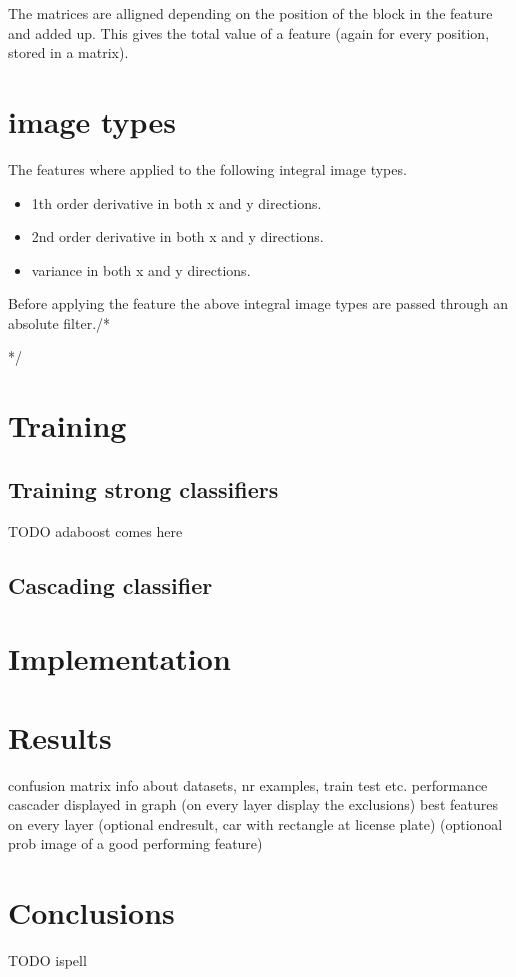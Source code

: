 \documentclass[a4paper,11pt]{article}
\begin{document}
{{{	The matrices are alligned depending on the position of the block in the
	feature and added up. This gives the total value of a feature (again for
	every position, stored in a matrix).

	\section{image types}
	The features where applied to the following integral image types.
	\begin{itemize}
		\item{1th order derivative in both x and y directions.}
		\item{2nd order derivative in both x and y directions.}
		\item{variance in both x and y directions.}
	\end{itemize}
	Before applying the feature the above integral image types are passed through an absolute filter./*}}}*/


\section{Training}
	\subsection*{Training strong classifiers}
	TODO adaboost comes here

	\subsection{Cascading classifier}


\section*{Implementation}

\section*{Results}
confusion matrix
info about datasets, nr examples, train test etc.
performance cascader displayed in graph (on every layer display the exclusions)
best features on every layer
(optional endresult, car with rectangle at license plate)
(optionoal prob image of a good performing feature)


\section*{Conclusions}

TODO ispell
\end{document}
